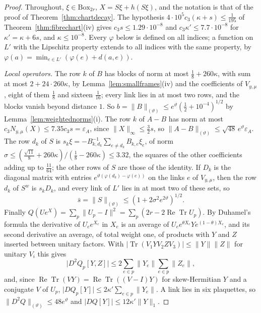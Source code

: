 \documentclass[11pt]{amsart}
\theoremstyle{definition}
\theoremstyle{remark}
\numberwithin{equation}{section}
\newcommand{\Tr}{\operatorname{Tr}}
\newcommand{\ReTr}{\operatorname{Re}\operatorname{Tr}}
\begin{document}
\begin{proof}
Throughout, $\xi\in\mathrm{Box}_{2r}$, $X=S\xi+h(S\xi)$, and the notation is
that of the proof of Theorem~\ref{thm:chartdecay}. The hypothesis
$4\cdot10^5c_3(\kappa+s)\le\frac1{195}$ of Theorem~\ref{thm:fibrechart}(iv)
gives $c_3s\le1.29\cdot10^{-8}$ and $c_3\kappa'\le7.7\cdot10^{-8}$ for
$\kappa'=\kappa+6s$, and $\kappa\le10^{-8}$. Every $\varphi$ below is
defined on all indices; a function on $L'$ with the Lipschitz property
extends to all indices with the same property, by $\varphi(a)=\min_{e\in L'}
(\varphi(e)+d(a,e))$.

\emph{Local operators.} The row $k$ of $B$ has blocks of norm at most $\frac
18+260\kappa$, with sum at most $2+24\cdot260\kappa$, by
Lemma~\ref{lem:smallframes}(iv) and the coefficients of $V_{y,\mu}$, eight of
them $\frac18$ and sixteen $\frac1{16}$; every link lies in at most two rows,
and the blocks vanish beyond distance $1$. So $b=\lVert B\rVert_{(\vartheta)}
\le e^\vartheta(\frac12+10^{-4})^{1/2}$ by Lemma~\ref{lem:weightednorms}(i).
The row $k$ of $A-B$ has norm at most $c_3N_{y,\mu}(X)\le7.35c_3s=
\varepsilon_A$, since $\lVert X\rVert_\infty\le\frac32s$, so $\lVert A-B
\rVert_{(\vartheta)}\le\sqrt{48}\,e^\vartheta\varepsilon_A$. The row $d_k$ of
$S$ is $s_k\xi=-B_{k,d_k}^{-1}\sum_{e\ne d_k}B_{k,e}\xi_e$, of norm $\sigma
\le(\frac{\sqrt{11}}8+260\kappa)/(\frac18-260\kappa)\le3.32$, the squares of
the other coefficients adding up to $\frac{11}{64}$; the other rows of $S$
are those of the identity. If $D_k$ is the diagonal matrix with entries
$e^{\vartheta(\varphi(d_k)-\varphi(e))}$ on the links $e$ of $V_{y,\mu}$,
then the row $d_k$ of $S^w$ is $s_kD_k$, and every link of $L'$ lies in at
most two of these sets, so
\[
\bar s=\lVert S\rVert_{(\vartheta)}\le(1+2\sigma^2e^{2\vartheta})^{1/2}.
\]
Finally $Q(Ue^X)=\sum_p\lVert U_p-I\rVert^2=\sum_p(2r-2\ReTr U_p)$. By
Duhamel's formula the derivative of $U_ee^{X_e}$ in $X_e$ is an average of
$U_ee^{\theta X_e}Ye^{(1-\theta)X_e}$, and its second derivative an average,
of total weight one, of products with $Y$ and $Z$ inserted between unitary
factors. With $\lvert\Tr(V_1YV_2ZV_3)\rvert\le\lVert Y\rVert\lVert Z\rVert$
for unitary $V_i$ this gives
\[
\bigl\lvert D^2Q_p[Y,Z]\bigr\rvert\le2\sum_{e\in p}\lVert Y_e\rVert\sum_{e
\in p}\lVert Z_e\rVert,
\]
and, since $\ReTr(VY)=\ReTr((V-I)Y)$ for skew-Hermitian $Y$ and a conjugate
$V$ of $U_p$, $\lvert DQ_p[Y]\rvert\le2\kappa'\sum_{e\in p}\lVert Y_e\rVert$.
A link lies in six plaquettes, so $\lVert D^2Q\rVert_{(\vartheta)}\le48
e^\vartheta$ and $\lvert DQ[Y]\rvert\le12\kappa'\lVert Y\rVert_1$.


\end{proof}
\end{document}
